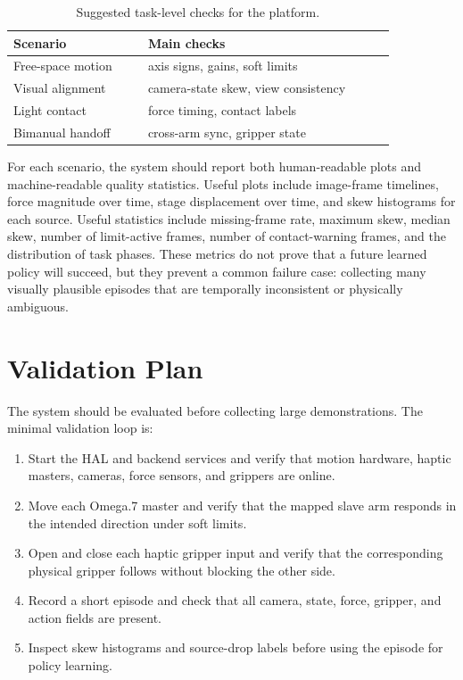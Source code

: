 \documentclass[10pt,twocolumn,letterpaper]{article}
\begin{document}
\begin{table}[t]
  \centering
  \footnotesize
  \caption{Suggested task-level checks for the platform.}
  \label{tab:scenarios}
  \begin{tabular}{@{}L{0.30\linewidth}L{0.55\linewidth}@{}}
    \toprule
    Scenario & Main checks \\
    \midrule
    Free-space motion & axis signs, gains, soft limits \\
    Visual alignment & camera-state skew, view consistency \\
    Light contact & force timing, contact labels \\
    Bimanual handoff & cross-arm sync, gripper state \\
    \bottomrule
  \end{tabular}
\end{table}

For each scenario, the system should report both human-readable plots and
machine-readable quality statistics. Useful plots include image-frame
timelines, force magnitude over time, stage displacement over time, and
skew histograms for each source. Useful statistics include missing-frame
rate, maximum skew, median skew, number of limit-active frames, number of
contact-warning frames, and the distribution of task phases. These
metrics do not prove that a future learned policy will succeed, but they
prevent a common failure case: collecting many visually plausible
episodes that are temporally inconsistent or physically ambiguous.

\balance
\section{Validation Plan}
The system should be evaluated before collecting large demonstrations.
The minimal validation loop is:
\begin{enumerate}[leftmargin=1.3em,itemsep=1pt,topsep=2pt]
  \item Start the HAL and backend services and verify that motion
  hardware, haptic masters, cameras, force sensors, and grippers are
  online.
  \item Move each Omega.7 master and verify that the mapped slave arm
  responds in the intended direction under soft limits.
  \item Open and close each haptic gripper input and verify that the
  corresponding physical gripper follows without blocking the other side.
  \item Record a short episode and check that all camera, state, force,
  gripper, and action fields are present.
  \item Inspect skew histograms and source-drop labels before using the
  episode for policy learning.
\end{enumerate}
\end{document}
